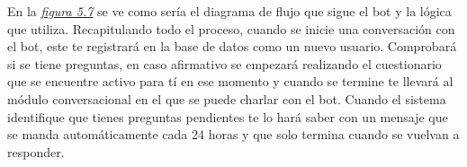 En la \textit{\hyperref[fig:flujo]{figura 5.7}} se ve como sería el diagrama de flujo que sigue el bot y la lógica que utiliza. Recapitulando todo el proceso, cuando se inicie una conversación con el bot, este te registrará en la base de datos como un nuevo usuario. Comprobará si se tiene preguntas, en caso afirmativo se empezará realizando el cuestionario que se encuentre activo para tí en ese momento y cuando se termine te llevará al módulo conversacional en el que se puede charlar con el bot. Cuando el sistema identifique que tienes preguntas pendientes te lo hará saber con un mensaje que se manda automáticamente cada 24 horas y que solo termina cuando se vuelvan a responder.